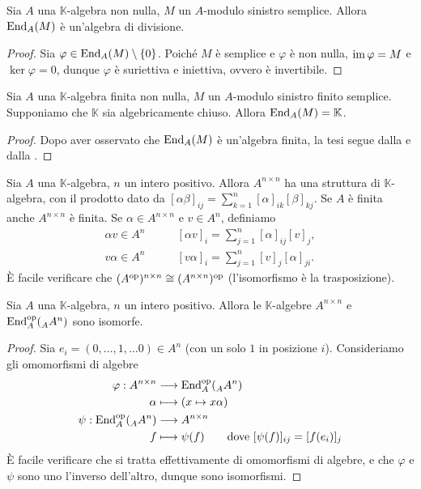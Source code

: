 \begin{proposition}
Sia $A$ una $\mathbb{K}$-algebra non nulla, $M$ un $A$-modulo sinistro semplice. Allora $\operatorname{End}_A(M)$ è un'algebra di divisione.
\end{proposition}
\begin{proof}
Sia $\varphi\in\operatorname{End}_A(M)\setminus\{0\}$. Poiché $M$ è semplice e $\varphi$ è non nulla, $\operatorname{im}\varphi=M$ e $\ker\varphi=0$, dunque $\varphi$ è suriettiva e iniettiva, ovvero è invertibile.
\end{proof}


\begin{corollary}
Sia $A$ una $\mathbb{K}$-algebra finita non nulla, $M$ un $A$-modulo sinistro finito semplice. Supponiamo che $\mathbb{K}$ sia algebricamente chiuso. Allora  $\operatorname{End}_A(M)=\mathbb{K}$.
\end{corollary}
\begin{proof}
Dopo aver osservato che $\operatorname{End}_A(M)$ è un'algebra finita, la tesi segue dalla  e dalla .
\end{proof}


Sia $A$ una $\mathbb{K}$-algebra, $n$ un intero positivo. Allora $A^{n\times n}$ ha una struttura di $\mathbb{K}$-algebra, con il prodotto dato da $[\alpha\beta]_{ij}=\sum_{k=1}^{n}[\alpha]_{ik}[\beta]_{kj}$. Se $A$ è finita anche $A^{n\times n}$ è finita. Se $\alpha\in A^{n\times n}$ e $v\in A^n$, definiamo
\begin{align*}
\alpha v\in A^n&\qquad[\alpha v]_i=\sum_{j=1}^{n}[\alpha]_{ij}[v]_j,\\
v\alpha\in A^n&\qquad[v\alpha]_i=\sum_{j=1}^{n}[v]_j[\alpha]_{ji}.
\end{align*}
È facile verificare che $(A^{\operatorname{op}})^{n\times n}\cong(A^{n\times n})^{\operatorname{op}}$ (l'isomorfismo è la trasposizione).



\begin{proposition}
Sia $A$ una $\mathbb{K}$-algebra, $n$ un intero positivo. Allora le $\mathbb{K}$-algebre $A^{n\times n}$ e $\operatorname{End}^{\operatorname{op}}_A(\prescript{}{A}{A}^n)$ sono isomorfe.
\end{proposition}
\begin{proof}
Sia $e_i=(0,\ldots,1,\ldots 0)\in A^n$ (con un solo $1$ in posizione $i$). Consideriamo gli omomorfismi di algebre
\begin{align*}
\varphi:A^{n\times n}&\longrightarrow\operatorname{End}^{\operatorname{op}}_A(\prescript{}{A}{A}^n)\\
\alpha&\longmapsto(x\mapsto x\alpha)\\
\psi:\operatorname{End}^{\operatorname{op}}_A(\prescript{}{A}{A}^n)&\longrightarrow A^{n\times n}\\
f&\longmapsto\psi(f)\qquad\text{dove $[\psi(f)]_{ij}=[f(e_i)]_j$}
\end{align*}
È facile verificare che si tratta effettivamente di omomorfismi di algebre, e che $\varphi$ e $\psi$ sono uno l'inverso dell'altro, dunque sono isomorfismi.
\end{proof}

